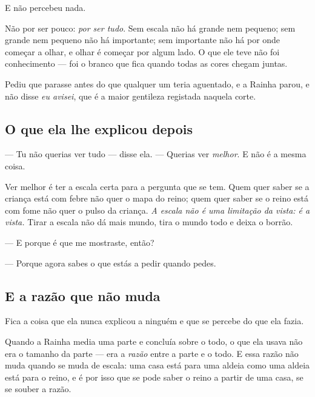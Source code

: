 \documentclass[livro.tex]{subfiles}
\begin{document}
\medskip

E não percebeu nada.

\medskip

Não por ser pouco: \emph{por ser tudo}. Sem escala não há grande nem pequeno; sem grande nem
pequeno não há importante; sem importante não há por onde começar a olhar, e olhar é começar por
algum lado. O que ele teve não foi conhecimento --- foi o branco que fica quando todas as cores
chegam juntas.

\medskip

Pediu que parasse antes do que qualquer um teria aguentado, e a Rainha parou, e não disse
\emph{eu avisei}, que é a maior gentileza registada naquela corte.

\subsection*{O que ela lhe explicou depois}

--- Tu não querias ver tudo --- disse ela. --- Querias ver \emph{melhor}. E não é a mesma coisa.

\medskip

Ver melhor é ter a escala certa para a pergunta que se tem. Quem quer saber se a criança está com
febre não quer o mapa do reino; quem quer saber se o reino está com fome não quer o pulso da
criança. \emph{A escala não é uma limitação da vista: é a vista.} Tirar a escala não dá mais
mundo, tira o mundo todo e deixa o borrão.

\medskip

--- E porque é que me mostraste, então?

--- Porque agora sabes o que estás a pedir quando pedes.

\subsection*{E a razão que não muda}

Fica a coisa que ela nunca explicou a ninguém e que se percebe do que ela fazia.

\medskip

Quando a Rainha media uma parte e concluía sobre o todo, o que ela usava não era o tamanho da
parte --- era a \emph{razão} entre a parte e o todo. E essa razão não muda quando se muda de
escala: uma casa está para uma aldeia como uma aldeia está para o reino, e é por isso que se pode
saber o reino a partir de uma casa, se se souber a razão.

\medskip
\end{document}
